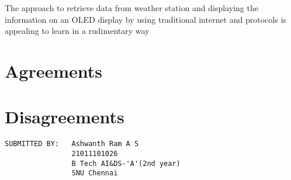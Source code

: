 \documentclass{article}
\begin{document}
The approach to retrieve data from weather station and displaying the information on an OLED display by using traditional internet and protocols is appealing to learn in a rudimentary way

\section{Agreements}


\section{Disagreements}



\begin{verbatim}
SUBMITTED BY:   Ashwanth Ram A S
                21011101026
                B Tech AI&DS-'A'(2nd year)
                SNU Chennai
\end{verbatim}
\end{document}
